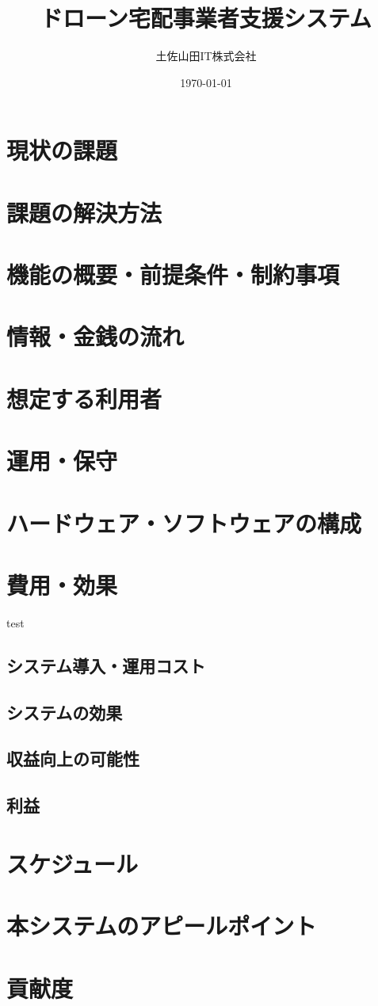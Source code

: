 \documentclass[a4paper, titlepage]{jsarticle}
\date{\today}
\title{ドローン宅配事業者支援システム}
\author{土佐山田IT株式会社}
\begin{document}
\maketitle

\tableofcontents

\clearpage

\section{現状の課題}

\section{課題の解決方法}

\section{機能の概要・前提条件・制約事項}

\section{情報・金銭の流れ}

\section{想定する利用者}

\section{運用・保守}

\section{ハードウェア・ソフトウェアの構成}

\section{費用・効果}
test
\subsection{システム導入・運用コスト}

\subsection{システムの効果}

\subsection{収益向上の可能性}

\subsection{利益}


\section{スケジュール}

\section{本システムのアピールポイント}

\section{貢献度}
\end{document}
